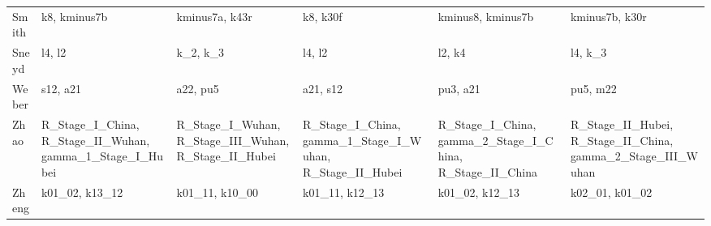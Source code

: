 \begin{longtable}{@{}l>{\raggedright}p{2.6cm}>{\raggedright}p{2.6cm}>{\raggedright}p{2.6cm}>{\raggedright}p{2.6cm}>{\raggedright\arraybackslash}p{2.6cm}@{}}
Smith & k8, kminus7b & kminus7a, k43r & k8, k30f & kminus8, kminus7b & kminus7b, k30r \\
Sneyd & l4, l2 & k\_\allowbreak{}2, k\_\allowbreak{}3 & l4, l2 & l2, k4 & l4, k\_\allowbreak{}3 \\
Weber & s12, a21 & a22, pu5 & a21, s12 & pu3, a21 & pu5, m22 \\
Zhao & R\_\allowbreak{}Stage\_\allowbreak{}I\_\allowbreak{}China, R\_\allowbreak{}Stage\_\allowbreak{}II\_\allowbreak{}Wuhan, gamma\_\allowbreak{}1\_\allowbreak{}Stage\_\allowbreak{}I\_\allowbreak{}Hubei & R\_\allowbreak{}Stage\_\allowbreak{}I\_\allowbreak{}Wuhan, R\_\allowbreak{}Stage\_\allowbreak{}III\_\allowbreak{}Wuhan, R\_\allowbreak{}Stage\_\allowbreak{}II\_\allowbreak{}Hubei & R\_\allowbreak{}Stage\_\allowbreak{}I\_\allowbreak{}China, gamma\_\allowbreak{}1\_\allowbreak{}Stage\_\allowbreak{}I\_\allowbreak{}Wuhan, R\_\allowbreak{}Stage\_\allowbreak{}II\_\allowbreak{}Hubei & R\_\allowbreak{}Stage\_\allowbreak{}I\_\allowbreak{}China, gamma\_\allowbreak{}2\_\allowbreak{}Stage\_\allowbreak{}I\_\allowbreak{}China, R\_\allowbreak{}Stage\_\allowbreak{}II\_\allowbreak{}China & R\_\allowbreak{}Stage\_\allowbreak{}II\_\allowbreak{}Hubei, R\_\allowbreak{}Stage\_\allowbreak{}II\_\allowbreak{}China, gamma\_\allowbreak{}2\_\allowbreak{}Stage\_\allowbreak{}III\_\allowbreak{}Wuhan \\
Zheng & k01\_\allowbreak{}02, k13\_\allowbreak{}12 & k01\_\allowbreak{}11, k10\_\allowbreak{}00 & k01\_\allowbreak{}11, k12\_\allowbreak{}13 & k01\_\allowbreak{}02, k12\_\allowbreak{}13 & k02\_\allowbreak{}01, k01\_\allowbreak{}02 \\
\bottomrule
\end{longtable}
